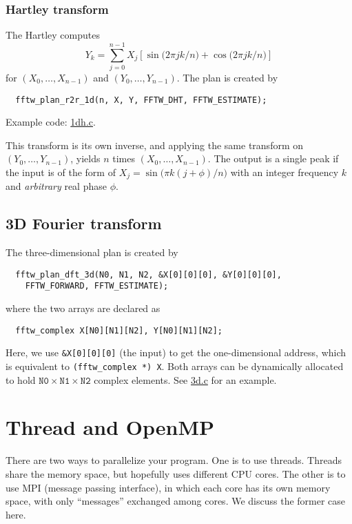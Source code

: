 \documentclass[12pt]{article}
\begin{document}
\subsubsection{Hartley transform}
The Hartley computes
\begin{equation}
  Y_k = \sum_{j = 0}^{n - 1} X_j
    \left[
      \sin\big( 2 \pi j k / n \big)
      + \cos\big( 2 \pi j k / n \big)
    \right]
\end{equation}
%
for $(X_0, \dots, X_{n - 1})$ and $(Y_0, \dots, Y_{n-1})$.
%
The plan is created by
\begin{verbatim}
  fftw_plan_r2r_1d(n, X, Y, FFTW_DHT, FFTW_ESTIMATE);
\end{verbatim}
Example code: \url{1dh.c}.


This transform is its own inverse,
%
and applying the same transform on $(Y_0, \dots, Y_{n-1})$,
  yields $n$ times $(X_0, \dots, X_{n-1})$.
The output is a single peak if the input is of the form of
  $X_j = \sin\big(\pi k (j + \phi) / n \big)$
  with an integer frequency $k$
  and \emph{arbitrary} real phase $\phi$.





\subsection{3D Fourier transform}

The three-dimensional plan is created by
\begin{verbatim}
  fftw_plan_dft_3d(N0, N1, N2, &X[0][0][0], &Y[0][0][0],
    FFTW_FORWARD, FFTW_ESTIMATE);
\end{verbatim}
where the two arrays are declared as
\begin{verbatim}
  fftw_complex X[N0][N1][N2], Y[N0][N1][N2];
\end{verbatim}
%
Here, we use
\texttt{\&X[0][0][0]} (the input)
to get the one-dimensional address,
which is equivalent to
\texttt{(fftw\_complex *) X}.
%
Both arrays can be dynamically allocated
to hold $\mathtt{N0} \times \mathtt{N1} \times \mathtt{N2}$
complex elements.
%
See \url{3d.c} for an example.




\section{Thread and OpenMP}

There are two ways to parallelize your program.
%
One is to use threads.
%
Threads share the memory space,
  but hopefully uses different CPU cores.
%
The other is to use MPI (message passing interface),
%
in which each core has its own memory space,
%
with only ``messages'' exchanged among cores.
%
We discuss the former case here.
\end{document}
